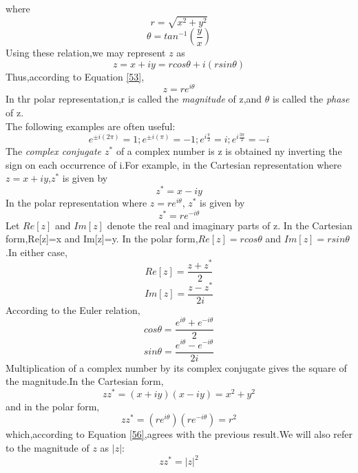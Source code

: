 \documentclass[12pt]{article}
\numberwithin{equation}{section}
\begin{document}
\newpage
where
\begin{equation}
    r=\sqrt{x^2+y^2}\label{56}
\end{equation}
\begin{equation}
    \theta=tan^{-1}({\frac{y}{x}})
\end{equation}
Using these relation,we may represent $z$ as
\begin{equation}
    z=x+iy=rcos \theta+i(rsin \theta)
\end{equation}
Thus,according to Equation \eqref{53},
\begin{equation}
    z=re^{i\theta}
\end{equation}
In thr polar representation,r is called the \emph{magnitude} of z,and $\theta$ is called the \emph{phase} of z.\\
The following examples are often useful:\\
\begin{equation}
    e^{\pm i(2\pi)}=1;e^{\pm i(\pi)}=-1;e^{i\frac{\pi}{2}}=i;e^{i\frac{3\pi}{2}}=-i
\end{equation}
\indent The \emph{complex conjugate $z^*$} of a complex number is z is obtained ny inverting the sign on each occurrence of i.For example, in the Cartesian representation where $z=x+iy$,$z^*$ is given by
\begin{equation}
    z^*=x-iy
\end{equation}
In the polar representation where $z=re^{i\theta}$, $z^*$ is given by
\begin{equation}
    z^*=re^{-i\theta}
\end{equation}
\indent Let $Re[z]$ and $Im[z]$ denote the real and imaginary parts of z. In the Cartesian form,Re[z]=x and Im[z]=y.
In the polar form,$Re[z]=rcos\theta$ and $Im[z]=rsin\theta$.In either case,
\begin{equation}
    Re[z]=\frac{z+z^*}{2}
\end{equation}
\begin{equation}
    Im[z]=\frac{z-z^*}{2i}
\end{equation}
According to the Euler relation,
\begin{equation}
    cos \theta=\frac{e^{i\theta}+e^{-i\theta}}{2}
\end{equation}
\begin{equation}
    sin \theta=\frac{e^{i\theta}-e^{-i\theta}}{2i}
\end{equation}
Multiplication of a complex number by its complex conjugate gives the square of the magnitude.In the Cartesian form,
\begin{equation}
    zz^*=(x+iy)(x-iy)=x^2+y^2
\end{equation}
and in the polar form,
\begin{equation}
    zz^*=(re^{i\theta})(re^{-i\theta})=r^2
\end{equation}
which,according to Equation \eqref{56},agrees with the previous result.We will also refer to the magnitude of $z$ as $\vert z \vert$:
\begin{equation}
    zz^*=\vert z \vert^2
\end{equation}




    
\end{document}
